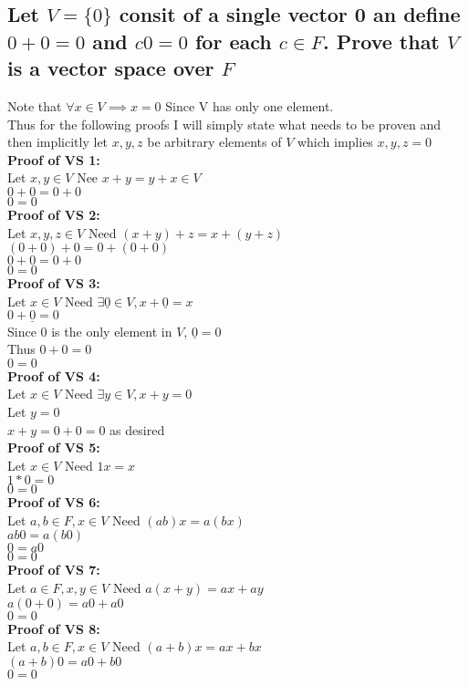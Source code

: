 \documentclass{article}
\begin{document}
\subsection*{Let $V = \{0\}$ consit of a single vector 0 an define $0+0 = 0$ and $c0 = 0$ for each $c \in F$. Prove that $V$ is a vector space over $F$}
Note that $\forall x \in V \implies x = 0$ Since V has only one element.\\
Thus for the following proofs I will simply state what needs to be proven and then implicitly let $x, y, z $ be arbitrary elements of $V$ which implies $x,y,z = 0$\\
\textbf{Proof of VS 1:}\\
Let $x,y \in V$ Nee $x+y = y+x \in V$\\
$0 + 0 = 0 + 0$\\ 
$0 = 0$\\
\textbf{Proof of VS 2:}\\
Let $x,y,z \in V$ Need $(x+y)+z = x+(y+z)$\\
$(0 + 0) + 0 = 0 + (0 + 0)$\\
$0 + 0 = 0 + 0$\\
$0 = 0$\\
\textbf{Proof of VS 3:}\\
Let $x \in V$ Need $\exists \underline{0} \in V, x + \underline{0} = x$\\
$ 0 + \underline{0} = 0$\\
Since $0$ is the only element in $V$, $\underline{0} = 0$\\
Thus $0+0=0$\\
$0=0$\\
\textbf{Proof of VS 4:}\\
Let $x \in V$ Need $\exists y \in V, x + y = 0$\\
Let $y = 0$\\
$x +y = 0 + 0 = 0$ as desired\\
\textbf{Proof of VS 5:}\\
Let $x \in V$ Need $1x = x$\\
$1*0 = 0$\\
$0 = 0$\\
\textbf{Proof of VS 6:}\\
Let $a,b \in F, x \in V$ Need $(ab)x = a(bx)$\\
$ab0 = a(b0)$\\
$0 = a0$\\
$0 = 0$\\
\textbf{Proof of VS 7:}\\
Let $a \in F, x,y \in V$ Need $a(x+y) = ax + ay$\\
$a(0+0) = a0 + a0$\\
$0 = 0$\\
\textbf{Proof of VS 8:}\\
Let $a,b \in F, x \in V$ Need $(a+b)x = ax + bx$\\
$(a+b)0 = a0 + b0$\\
$0 = 0$\\
\end{document}

